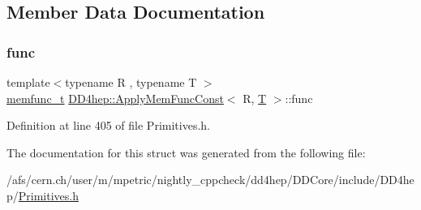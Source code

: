 \subsection{Member Data Documentation}
\hypertarget{struct_d_d4hep_1_1_apply_mem_func_const_a667382c86c9164ebeb9ff332d34d082a}{}\label{struct_d_d4hep_1_1_apply_mem_func_const_a667382c86c9164ebeb9ff332d34d082a} 
\subsubsection{\texorpdfstring{func}{func}}
{\footnotesize\ttfamily template$<$typename R , typename T $>$ \\
\hyperlink{struct_d_d4hep_1_1_apply_mem_func_const_a0baa998fbf89b0c25d9de76bbd9a95e7}{memfunc\+\_\+t} \hyperlink{struct_d_d4hep_1_1_apply_mem_func_const}{D\+D4hep\+::\+Apply\+Mem\+Func\+Const}$<$ R, \hyperlink{class_t}{T} $>$\+::func}



Definition at line 405 of file Primitives.\+h.



The documentation for this struct was generated from the following file\+:\begin{DoxyCompactItemize}
\item 
/afs/cern.\+ch/user/m/mpetric/nightly\+\_\+cppcheck/dd4hep/\+D\+D\+Core/include/\+D\+D4hep/\hyperlink{_primitives_8h}{Primitives.\+h}\end{DoxyCompactItemize}
